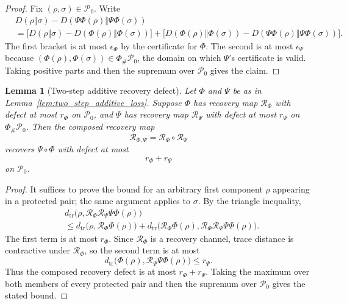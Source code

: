 \documentclass[11pt]{article}
\newtheorem{lemma}[theorem]{Lemma}
\newcommand{\Pcal}{\mathcal{P}}
\newcommand{\Rcal}{\mathcal{R}}
\newcommand{\1}{\mathbf{1}}
\begin{document}
\begin{proof}
Fix \((\rho,\sigma)\in\Pcal_0\).  Write
\[
\begin{aligned}
&D(\rho\Vert\sigma)-D(\Psi\Phi(\rho)\Vert\Psi\Phi(\sigma))\\
&=\bigl[D(\rho\Vert\sigma)-D(\Phi(\rho)\Vert\Phi(\sigma))\bigr]
+\bigl[D(\Phi(\rho)\Vert\Phi(\sigma))-D(\Psi\Phi(\rho)\Vert\Psi\Phi(\sigma))\bigr].
\end{aligned}
\]
The first bracket is at most \(\epsilon_\Phi\) by the certificate for \(\Phi\).  The second is at most \(\epsilon_\Psi\) because \((\Phi(\rho),\Phi(\sigma))\in\Phi_\#\Pcal_0\), the domain on which \(\Psi\)'s certificate is valid.  Taking positive parts and then the supremum over \(\Pcal_0\) gives the claim.
\end{proof}

\begin{lemma}[Two-step additive recovery defect]
\label{lem:two_step_additive_recovery}
Let \(\Phi\) and \(\Psi\) be as in Lemma~\ref{lem:two_step_additive_loss}.  Suppose \(\Phi\) has recovery map \(\Rcal_\Phi\) with defect at most \(r_\Phi\) on \(\Pcal_0\), and \(\Psi\) has recovery map \(\Rcal_\Psi\) with defect at most \(r_\Psi\) on \(\Phi_\#\Pcal_0\).  Then the composed recovery map
\[
\Rcal_{\Phi,\Psi}=\Rcal_\Phi\circ\Rcal_\Psi
\]
recovers \(\Psi\circ\Phi\) with defect at most
\[
r_\Phi+r_\Psi
\]
on \(\Pcal_0\).
\end{lemma}

\begin{proof}
It suffices to prove the bound for an arbitrary first component \(\rho\) appearing in a protected pair; the same argument applies to \(\sigma\).  By the triangle inequality,
\[
\begin{aligned}
&d_{\mathrm{tr}}\bigl(\rho,\Rcal_\Phi\Rcal_\Psi\Psi\Phi(\rho)\bigr)\\
&\le d_{\mathrm{tr}}\bigl(\rho,\Rcal_\Phi\Phi(\rho)\bigr)
+d_{\mathrm{tr}}\bigl(\Rcal_\Phi\Phi(\rho),\Rcal_\Phi\Rcal_\Psi\Psi\Phi(\rho)\bigr).
\end{aligned}
\]
The first term is at most \(r_\Phi\).  Since \(\Rcal_\Phi\) is a recovery channel, trace distance is contractive under \(\Rcal_\Phi\), so the second term is at most
\[
d_{\mathrm{tr}}\bigl(\Phi(\rho),\Rcal_\Psi\Psi\Phi(\rho)\bigr)
\le r_\Psi.
\]
Thus the composed recovery defect is at most \(r_\Phi+r_\Psi\).  Taking the maximum over both members of every protected pair and then the supremum over \(\Pcal_0\) gives the stated bound.
\end{proof}
\end{document}
